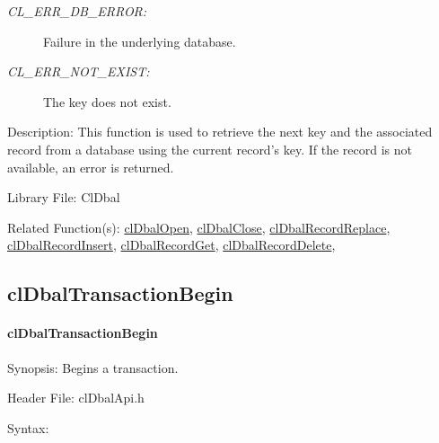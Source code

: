 \begin{flushleft}
\begin{Desc}
\begin{description}
\item[{\em CL\_\-ERR\_\-DB\_\-ERROR:}]Failure in the underlying database. 
\item[{\em CL\_\-ERR\_\-NOT\_\-EXIST:}]The key does not exist.\end{description}
\end{Desc}
\begin{Desc}
\item[Description:]This function is used to retrieve the next key and the associated record from a database using the current record's key. If the record 
is not available, an error is returned.\end{Desc}
\begin{Desc}
\item[Library File:]Cl\-Dbal\end{Desc}
\begin{Desc}
\item[Related Function(s):]\hyperlink{pagedbal103}{cl\-Dbal\-Open}, \hyperlink{pagedbal104}{cl\-Dbal\-Close}, 
\hyperlink{pagedbal106}{cl\-Dbal\-Record\-Replace}, \hyperlink{pagedbal105}{cl\-Dbal\-Record\-Insert}, 
\hyperlink{pagedbal107}{cl\-Dbal\-Record\-Get}, \hyperlink{pagedbal108}{cl\-Dbal\-Record\-Delete}, \end{Desc}


\newpage

\subsection{clDbalTransactionBegin}
\hypertarget{pagedbal111}{}\paragraph{cl\-Dbal\-Transaction\-Begin}\label{pagedbal111}
\begin{Desc}
\item[Synopsis:]Begins a transaction.\end{Desc}
\begin{Desc}
\item[Header File:]clDbalApi.h\end{Desc}
\begin{Desc}
\item[Syntax:]


\end{Desc}
\end{flushleft}
